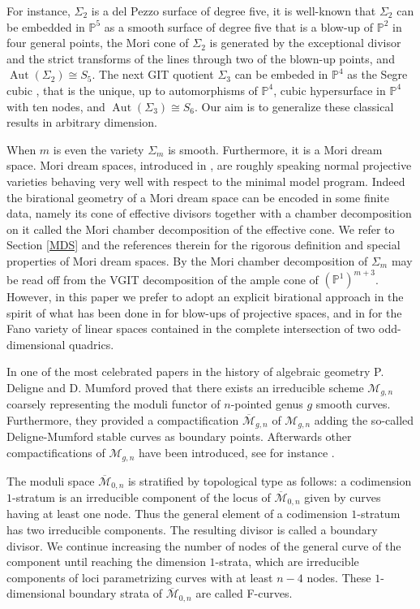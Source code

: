 \documentclass[a4paper,10pt]{amsart}
\theoremstyle{definition}
\newcommand{\Aut}{\operatorname{Aut}}
\newcommand{\cM}{\overline{\mathcal{M}}}
\begin{document}
For instance, $\Sigma_2$ is a del Pezzo surface of degree five, it is well-known that $\Sigma_2$ can be embedded in $\mathbb{P}^5$ as a smooth surface of degree five that is a blow-up of $\mathbb{P}^2$ in four general points, the Mori cone of $\Sigma_2$ is generated by the exceptional divisor  and the strict transforms of the lines through two of the blown-up points, and $\Aut(\Sigma_2)\cong S_5$. The next GIT quotient $\Sigma_3$ can be embeded in $\mathbb{P}^4$ as the Segre cubic \cite{Do15}, that is the unique, up to automorphisms of $\mathbb{P}^4$, cubic hypersurface in $\mathbb{P}^4$ with ten nodes, and $\Aut(\Sigma_3)\cong S_6$. Our aim is to generalize these classical results in arbitrary dimension. 

When $m$ is even the variety $\Sigma_m$ is smooth. Furthermore, it is a Mori dream space. Mori dream spaces, introduced in \cite{HK00}, are roughly speaking normal projective varieties behaving very well with respect to the minimal model program. Indeed the birational geometry of a Mori dream space can be encoded in some finite data, namely its cone of effective divisors together with a chamber decomposition on it called the Mori chamber decomposition of the effective cone. We refer to Section \ref{MDS} and the references therein for the rigorous definition and special properties of Mori dream spaces. By \cite[Section 2]{HK00} the Mori chamber decomposition of $\Sigma_m$ may be read off from the VGIT decomposition of the ample cone of $(\mathbb{P}^1)^{m+3}$. However, in this paper we prefer to adopt an explicit birational approach in the spirit of what has been done in \cite{AM16} for blow-ups of projective spaces, and in \cite{AC16} for the Fano variety of linear spaces contained in the complete intersection of two odd-dimensional quadrics.

In one of the most celebrated papers \cite{DM69} in the history of algebraic geometry P. Deligne and D. Mumford proved that there exists an irreducible scheme $\mathcal{M}_{g,n}$ coarsely representing the moduli functor of $n$-pointed genus $g$ smooth curves. Furthermore, they provided a compactification $\overline{\mathcal{M}}_{g,n}$ of $\mathcal{M}_{g,n}$ adding the so-called Deligne-Mumford stable curves as boundary points. Afterwards other compactifications of $\mathcal{M}_{g,n}$ have been introduced, see for instance \cite{Ha}. 

The moduli space $\cM_{0,n}$ is stratified by topological type as follows: a codimension $1$-stratum is an irreducible component of the locus of $\cM_{0,n}$ given by curves having at least one node. Thus the general element of a codimension $1$-stratum has two irreducible components. The resulting divisor is called a boundary divisor. We continue increasing the number of nodes of the general curve of the component until reaching the dimension $1$-strata, which are irreducible components of loci parametrizing curves with at least $n - 4$ nodes. These $1$-dimensional boundary strata of $\cM_{0,n}$ are called F-curves.
\end{document}
